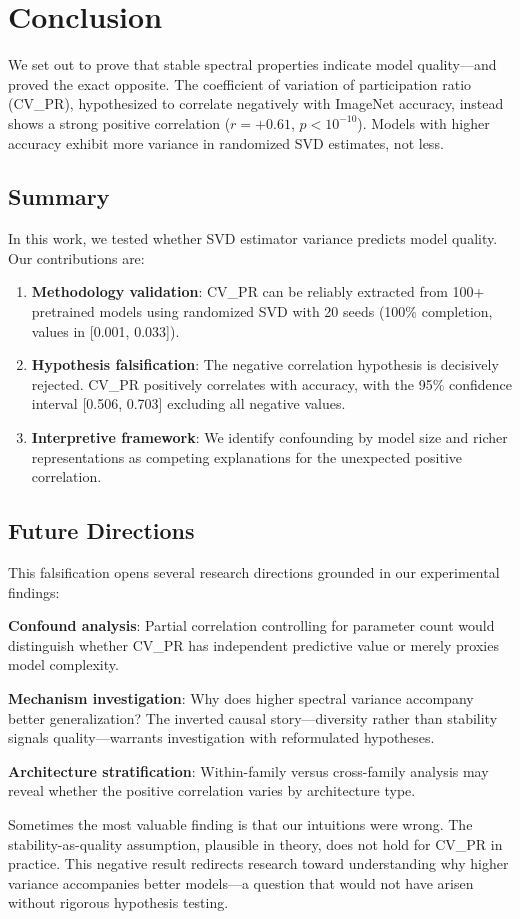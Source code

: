 \section{Conclusion}
\label{sec:conclusion}

We set out to prove that stable spectral properties indicate model quality---and proved the exact opposite. The coefficient of variation of participation ratio (CV\_PR), hypothesized to correlate negatively with ImageNet accuracy, instead shows a strong positive correlation ($r = +0.61$, $p < 10^{-10}$). Models with higher accuracy exhibit more variance in randomized SVD estimates, not less.

\subsection{Summary}

In this work, we tested whether SVD estimator variance predicts model quality. Our contributions are:

\begin{enumerate}
    \item \textbf{Methodology validation}: CV\_PR can be reliably extracted from 100+ pretrained models using randomized SVD with 20 seeds (100\% completion, values in [0.001, 0.033]).

    \item \textbf{Hypothesis falsification}: The negative correlation hypothesis is decisively rejected. CV\_PR positively correlates with accuracy, with the 95\% confidence interval [0.506, 0.703] excluding all negative values.

    \item \textbf{Interpretive framework}: We identify confounding by model size and richer representations as competing explanations for the unexpected positive correlation.
\end{enumerate}

\subsection{Future Directions}

This falsification opens several research directions grounded in our experimental findings:

\textbf{Confound analysis}: Partial correlation controlling for parameter count would distinguish whether CV\_PR has independent predictive value or merely proxies model complexity.

\textbf{Mechanism investigation}: Why does higher spectral variance accompany better generalization? The inverted causal story---diversity rather than stability signals quality---warrants investigation with reformulated hypotheses.

\textbf{Architecture stratification}: Within-family versus cross-family analysis may reveal whether the positive correlation varies by architecture type.

Sometimes the most valuable finding is that our intuitions were wrong. The stability-as-quality assumption, plausible in theory, does not hold for CV\_PR in practice. This negative result redirects research toward understanding why higher variance accompanies better models---a question that would not have arisen without rigorous hypothesis testing.
